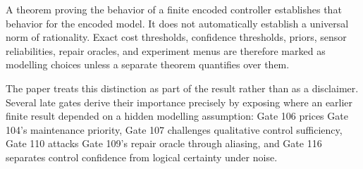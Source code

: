 A theorem proving the behavior of a finite encoded controller establishes that behavior for the encoded model. It does not automatically establish a universal norm of rationality. Exact cost thresholds, confidence thresholds, priors, sensor reliabilities, repair oracles, and experiment menus are therefore marked as modelling choices unless a separate theorem quantifies over them.

The paper treats this distinction as part of the result rather than as a disclaimer. Several late gates derive their importance precisely by exposing where an earlier finite result depended on a hidden modelling assumption: Gate 106 prices Gate 104's maintenance priority, Gate 107 challenges qualitative control sufficiency, Gate 110 attacks Gate 109's repair oracle through aliasing, and Gate 116 separates control confidence from logical certainty under noise.
